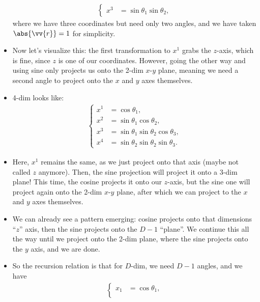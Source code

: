 \begin{itemize}
\begin{equation*}
\begin{alignedat}{1}
\begin{cases}
                x^3 &= \sin\theta_1\sin\theta_2,
            \end{cases}
            \end{alignedat}
        \end{equation*}
        where we have three coordinates but need only two angles, and we have taken $\abs{\vv{r}}=1$ for simplicity.
    \item Now let's visualize this: the first transformation to $x^1$ grabs the $z$-axis, which is fine, since $z$ is one of our coordinates. However, going the other way and using sine only projects us onto the 2-dim $x$-$y$ plane, meaning we need a second angle to project onto the $x$ and $y$ axes themselves.
    \item 4-dim looks like:
        \begin{equation*}
            \begin{alignedat}{1}
                \begin{cases}
                    x^1 &= \cos\theta_1, \\
                    x^2 &= \sin\theta_1\cos\theta_2, \\
                    x^3 &= \sin\theta_1\sin\theta_2\cos\theta_3, \\
                    x^4 &= \sin\theta_2\sin\theta_2\sin\theta_3.
                \end{cases}
                \end{alignedat}
        \end{equation*}
    \item Here, $x^1$ remains the same, as we just project onto that axis (maybe not called $z$ anymore). Then, the sine projection will project it onto a 3-dim plane! This time, the cosine projects it onto our $z$-axis, but the sine one will project again onto the 2-dim $x$-$y$ plane, after which we can project to the $x$ and $y$ axes themselves.
    \item We can already see a pattern emerging: cosine projects onto that dimensions ``$z$'' axis, then the sine projects onto the $D-1$ ``plane''. We continue this all the way until we project onto the 2-dim plane, where the sine projects onto the $y$ axis, and we are done.
    \item So the recursion relation is that for $D$-dim, we need $D-1$ angles, and we have
        \begin{equation*}
            \begin{alignedat}{1}
            \begin{cases}
                x_1 &= \cos\theta_1, \\

\end{cases}
\end{alignedat}
\end{equation*}
\end{itemize}
